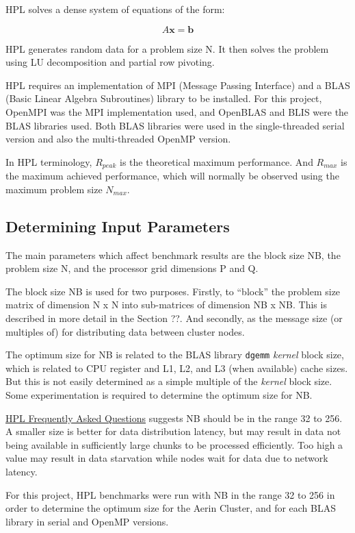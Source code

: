 \documentclass{report}
\begin{document}
HPL solves a dense system of equations of the form:

\[A\mathbf{x}=\mathbf{b}\]

HPL generates random data for a problem size N. It then solves the problem using LU decomposition and partial row pivoting.

HPL requires an implementation of MPI (Message Passing Interface) and a BLAS (Basic Linear Algebra Subroutines) library to be installed. For this project, OpenMPI was the MPI implementation used, and OpenBLAS and BLIS were the BLAS libraries used. Both BLAS libraries were used in the single-threaded serial version and also the multi-threaded OpenMP version.

In HPL terminology, $R_{peak}$ is the theoretical maximum performance. And $R_{max}$ is the maximum achieved performance, which will normally be observed using the maximum problem size $N_{max}$.


%
%
\subsection{Determining Input Parameters}

The main parameters which affect benchmark results are the block size NB, the problem size N, and the processor grid dimensions P and Q.

The block size NB is used for two purposes. Firstly, to ``block'' the problem size matrix of dimension N x N into sub-matrices of dimension NB x NB. This is described in more detail in the Section ??. And secondly, as the message size (or multiples of) for distributing data between cluster nodes.

The optimum size for NB is related to the BLAS library \verb|dgemm| \emph{kernel} block size, which is related to CPU register and L1, L2, and L3 (when available) cache sizes. But this is not easily determined as a simple multiple of the \emph{kernel} block size. Some experimentation is required to determine the optimum size for NB.

\href{https://www.netlib.org/benchmark/hpl/faqs.html}{HPL Frequently Asked Questions} suggests NB should be in the range 32 to 256. A smaller size is better for data distribution latency, but may result in data not being available in sufficiently large chunks to be processed efficiently. Too high a value may result in data starvation while nodes wait for data due to network latency.

For this project, HPL benchmarks were run with NB in the range 32 to 256 in order to determine the optimum size for the Aerin Cluster, and for each BLAS library in serial and OpenMP versions. 
\end{document}
